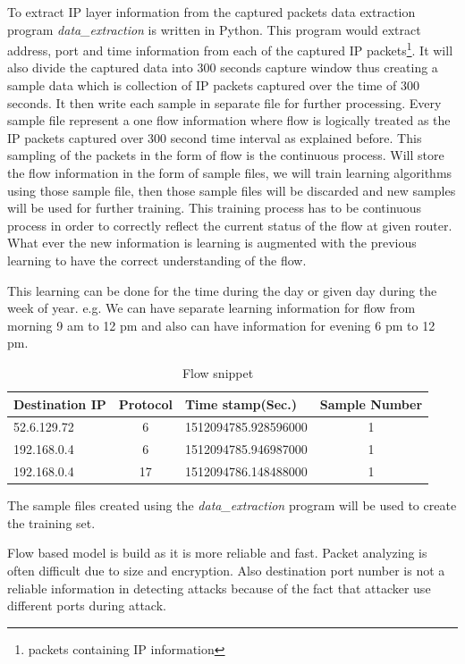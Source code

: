 \documentclass[10pt,oneside,a4paper]{article}
\begin{document}
To extract IP layer information from the captured packets data extraction program \textit{data\_extraction} is written in Python. This program would extract address, port and time information from each of the captured IP packets\footnote{packets containing IP information}. It will also divide the captured data into 300 seconds capture window thus creating a sample data which is collection of IP packets captured over the time of 300 seconds. It then write each sample in separate file for further processing. Every sample file represent a one flow information where flow is logically treated as the IP packets captured over 300 second time interval as explained before. This sampling of the packets in the form of flow is the continuous process. Will store the flow information in the form of sample files, we will train learning algorithms using those sample file, then those sample files will be discarded and new samples will be used for further training. This training process has to be continuous process in order to correctly reflect the current status of the flow at given router. What ever the new information is learning is augmented with the previous learning to have the correct understanding of the flow.

This learning can be done for the time during the day or given day during the week of year. e.g. We can have separate learning information for flow from morning 9 am to 12 pm and also can have information for evening 6 pm to 12 pm.

\begin{table}[H]
\centering
  \begin{tabular}{| l | c | l | c |}
    \hline
    Destination IP      & Protocol  & Time stamp(Sec.)  & Sample Number \\
    \hline
    52.6.129.72         & 6         & 1512094785.928596000  & 1 \\ \hline
    192.168.0.4         & 6         & 1512094785.946987000  & 1 \\ \hline
    192.168.0.4         & 17        & 1512094786.148488000  & 1 \\ \hline
  \end{tabular}
\caption{Flow snippet} \label{table:flow-snippet}
\end{table}

The sample files created using the \textit{data\_extraction} program will be used to create the training set.

Flow based model is build as it is more reliable and fast. Packet analyzing is often difficult due to size and encryption. Also destination port number is not a reliable information in detecting attacks because of the fact that attacker use different ports during attack.
\end{document}
